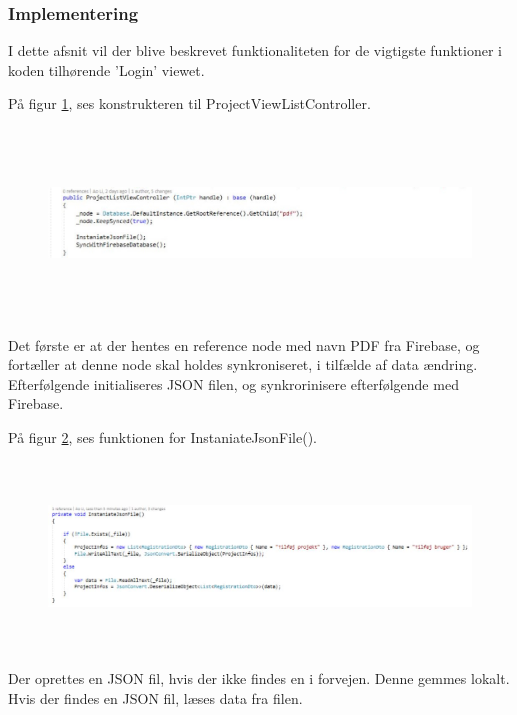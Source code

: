 \clearpage

\subsubsection{Implementering}
I dette afsnit vil der blive beskrevet funktionaliteten for de vigtigste funktioner i koden tilhørende 'Login' viewet.

På figur \ref{fig:ProjectListViewController}, ses konstrukteren til ProjectViewListController.
\begin{figure}[H] %
	\centering
	\includegraphics[height=5cm, width=17cm]{../ArkitekturDesign/Design/ProjectList/ProjectListViewController}
	\caption{}
	\label{fig:ProjectListViewController}
\end{figure}
Det første er at der hentes en reference node med navn PDF fra Firebase, og fortæller at denne node skal holdes synkroniseret, i tilfælde af data ændring. \\
Efterfølgende initialiseres JSON filen, og synkrorinisere efterfølgende med Firebase.

På figur \ref{fig:JSONFile}, ses funktionen for InstaniateJsonFile().
\begin{figure}[H] %
	\centering
	\includegraphics[height=5cm, width=15cm]{../ArkitekturDesign/Design/ProjectList/JSONFile}
	\caption{}
	\label{fig:JSONFile}
\end{figure}
Der oprettes en JSON fil, hvis der ikke findes en i forvejen. Denne gemmes lokalt.\\
Hvis der findes en JSON fil, læses data fra filen.


